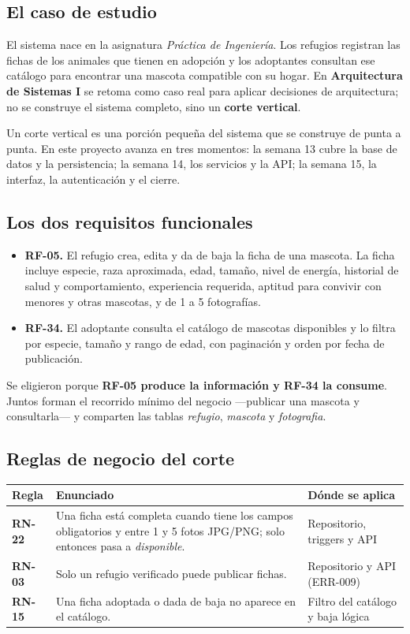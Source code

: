 \documentclass[11pt,a4paper]{article}
\newcommand{\thead}[1]{\textbf{#1}}
\begin{document}
\subsection{El caso de estudio}

El sistema nace en la asignatura \emph{Práctica de Ingeniería}. Los refugios
registran las fichas de los animales que tienen en adopción y los adoptantes
consultan ese catálogo para encontrar una mascota compatible con su hogar. En
\textbf{Arquitectura de Sistemas I} se retoma como caso real para aplicar
decisiones de arquitectura; no se construye el sistema completo, sino un
\textbf{corte vertical}.

Un corte vertical es una porción pequeña del sistema que se construye de punta a
punta. En este proyecto avanza en tres momentos: la semana 13 cubre la base de
datos y la persistencia; la semana 14, los servicios y la API; la semana 15, la
interfaz, la autenticación y el cierre.

\subsection{Los dos requisitos funcionales}

\begin{itemize}
\item \textbf{RF-05.} El refugio crea, edita y da de baja la ficha de una
  mascota. La ficha incluye especie, raza aproximada, edad, tamaño, nivel de
  energía, historial de salud y comportamiento, experiencia requerida, aptitud
  para convivir con menores y otras mascotas, y de 1 a 5 fotografías.
\item \textbf{RF-34.} El adoptante consulta el catálogo de mascotas disponibles
  y lo filtra por especie, tamaño y rango de edad, con paginación y orden por
  fecha de publicación.
\end{itemize}

Se eligieron porque \textbf{RF-05 produce la información y RF-34 la consume}.
Juntos forman el recorrido mínimo del negocio ---publicar una mascota y
consultarla--- y comparten las tablas \emph{refugio}, \emph{mascota} y
\emph{fotografia}.

\subsection{Reglas de negocio del corte}

{\footnotesize
\begin{tabularx}{\linewidth}{@{}V{0.4}V{1.7}V{0.9}@{}}
\toprule
\thead{Regla} & \thead{Enunciado} & \thead{Dónde se aplica} \\ \midrule
\textbf{RN-22} & Una ficha está completa cuando tiene los campos obligatorios y
entre 1 y 5 fotos JPG/PNG; solo entonces pasa a \emph{disponible}. &
Repositorio, triggers y API \\
\textbf{RN-03} & Solo un refugio verificado puede publicar fichas. &
Repositorio y API (ERR-009) \\
\textbf{RN-15} & Una ficha adoptada o dada de baja no aparece en el catálogo. &
Filtro del catálogo y baja lógica \\
\bottomrule
\end{tabularx}
}
\end{document}
